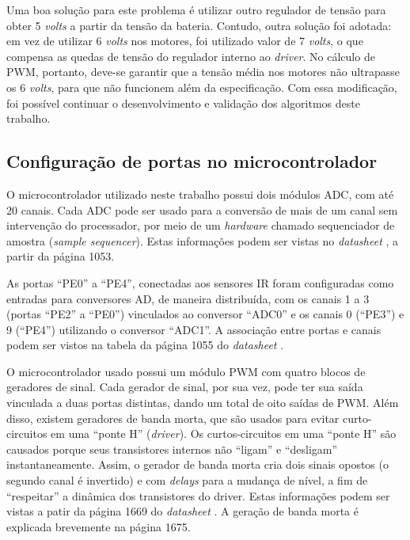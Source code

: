 	Uma boa solução para este problema é utilizar outro regulador de tensão para obter 
	5 \textit{volts} a partir da tensão da bateria. Contudo, outra solução foi adotada:
	em vez de utilizar 6 \textit{volts} nos motores, foi utilizado valor de 7 
	\textit{volts}, o que compensa as quedas de tensão do regulador interno ao 
	\textit{driver}. No cálculo de PWM, portanto, deve-se garantir que a tensão média nos 
	motores não ultrapasse os 6 \textit{volts}, para que não funcionem além da 
	especificação. Com essa modificação, foi possível continuar o desenvolvimento e 
	validação dos algoritmos deste trabalho.
	
	\subsection{Configuração de portas no microcontrolador}
	
	O microcontrolador utilizado neste trabalho possui dois módulos
	ADC, com até 20 canais. Cada ADC pode ser usado para a conversão de mais de um canal sem
	intervenção do processador, por meio de um \textit{hardware} chamado sequenciador de 
	amostra (\textit{sample sequencer}). Estas informações podem ser vistas no 
	\textit{datasheet} \cite{datasheet:TivaC}, a partir da página 1053.
	
	As portas ``PE0'' a ``PE4'', conectadas aos sensores IR foram configuradas como entradas
	para conversores AD, de maneira distribuída, com os canais 1 a 3 (portas ``PE2'' a ``PE0'')
	vinculados ao conversor ``ADC0'' e os canais 0 (``PE3'') e 9 (``PE4'') utilizando o 
	conversor ``ADC1''. A associação entre portas e canais podem ser vistos na tabela da 
	página 1055 do \textit{datasheet} \cite{datasheet:TivaC}. 
	
	O microcontrolador usado possui um módulo PWM com quatro blocos de geradores de sinal. 
	Cada gerador de sinal, por sua vez, pode ter sua saída vinculada a duas portas distintas,
	dando um total de oito saídas de PWM. Além disso, existem geradores de banda morta, que 
	são usados para evitar curto-circuitos em uma ``ponte H'' (\textit{driver}). Os 
	curtos-circuitos em uma ``ponte H'' são causados porque seus transistores internos 
	não ``ligam'' e ``desligam'' instantaneamente. Assim, o gerador de banda morta cria 
	dois sinais opostos (o segundo canal é invertido) e com \textit{delays} para a mudança 
	de nível, a fim de ``respeitar'' a dinâmica dos transistores do driver. Estas informações 
	podem ser vistas a patir da página 1669 do \textit{datasheet} \cite{datasheet:TivaC}. A 
	geração de banda morta é explicada brevemente na página 1675.
	
